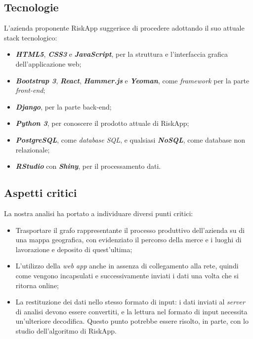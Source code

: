\subsection{Tecnologie}
L'azienda proponente RiskApp suggerisce di procedere adottando il suo attuale stack tecnologico:
\begin{itemize}
	\item \textbf{\textit{HTML5}}, \textbf{\textit{CSS3}} e \textbf{\textit{JavaScript}}, per la struttura e l'interfaccia grafica dell'applicazione web;
	\item \textbf{\textit{Bootstrap 3}}, \textbf{\textit{React}}, \textbf{\textit{Hammer.js}} e \textbf{\textit{Yeoman}}, come \textit{framework} per la parte \textit{front-end};
	\item \textbf{\textit{Django}}, per la parte back-end;
	\item \textbf{\textit{Python 3}}, per conoscere il prodotto attuale di RiskApp;
	\item \textbf{\textit{PostgreSQL}}, come \textit{database SQL}, e qualsiasi \textbf{\textit{NoSQL}}, come database non relazionale;
	\item \textbf{\textit{RStudio}} con \textbf{\textit{Shiny}}, per il processamento dati.
\end{itemize}

\subsection{Aspetti critici}

La nostra analisi ha portato a individuare diversi punti critici:
\begin{itemize}
	\item Trasportare il grafo rappresentante il processo produttivo dell’azienda su di una mappa geografica, con evidenziato il percorso della merce e i luoghi di lavorazione e deposito di quest'ultima;
	\item L'utilizzo della \textit{web app} anche in assenza di collegamento alla rete, quindi come vengono incapsulati e successivamente inviati i dati una volta che si ritorna online;
	\item La restituzione dei dati nello stesso formato di input: i dati inviati al \textit{server} di analisi devono essere convertiti, e la lettura nel formato di input necessita un'ulteriore decodifica. Questo punto potrebbe essere risolto, in parte, con lo studio dell’algoritmo di RiskApp.
\end{itemize}

